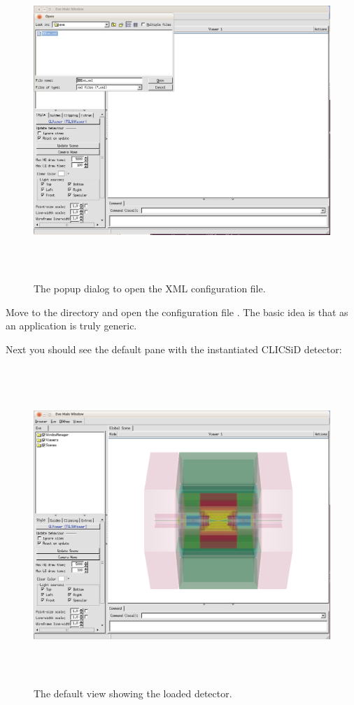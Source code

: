 \documentclass[10pt,a4paper]{article}
\begin{document}
\begin{figure}[h]
  \begin{center}
    \includegraphics[height=120mm] {DDEve_2}
    \caption{The \DDE popup dialog to open the XML configuration file.}
    \label{fig:DDEve_2}
  \end{center}
\end{figure}

\noindent
Move to the directory  and open the 
\DDE configuration file . The basic idea is that \DDE as an 
application is truly generic.


\newpage
\noindent
Next you should see the default pane with the instantiated CLICSiD detector:

\begin{figure}[t]
  \begin{center}
    \includegraphics[height=120mm] {DDEve_3}
    \caption{The \DDE default view showing the loaded detector.}
    \label{fig:DDEve_3}
  \end{center}
\end{figure}
\end{document}
